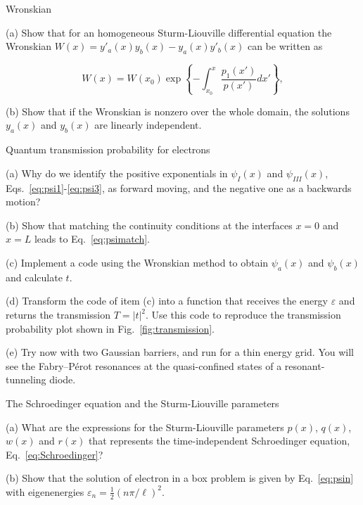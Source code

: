 \begin{problem}{Wronskian}
 \label{prob:Wronskian}

 (a) Show that for an homogeneous Sturm-Liouville differential equation the Wronskian $W(x) = y'_a(x)y_b(x)-y_a(x)y'_b(x)$ can be written as
 
\begin{equation}
 W(x) = W(x_0) \exp\left\{-\int_{x_0}^x \dfrac{p_1(x')}{p(x')}dx'\right\},
\end{equation}

 (b) Show that if the Wronskian is nonzero over the whole domain, the solutions $y_a(x)$ and $y_b(x)$ are linearly independent. 
 
\end{problem}


\begin{problem}{Quantum transmission probability for electrons}
 
 (a) Why do we identify the positive exponentials in $\psi_I(x)$ and $\psi_{III}(x)$, Eqs.~\eqref{eq:psi1}-\eqref{eq:psi3}, as forward moving, and the negative one as a backwards motion?
 
 (b) Show that matching the continuity conditions at the interfaces $x=0$ and $x=L$ leads to Eq.~\eqref{eq:psimatch}.
 
 (c) Implement a code using the Wronskian method to obtain $\psi_a(x)$ and $\psi_b(x)$ and calculate $t$.
 
 (d) Transform the code of item (c) into a function that receives the energy $\varepsilon$ and returns the transmission $T = |t|^2$. Use this code to reproduce the transmission probability plot shown in Fig.~\ref{fig:transmission}.
 
 (e) Try now with two Gaussian barriers, and run for a thin energy grid. You will see the Fabry–Pérot resonances at the quasi-confined states of a resonant-tunneling diode.
 
\end{problem}


\begin{problem}{The Schroedinger equation and the Sturm-Liouville parameters}
 
 (a) What are the expressions for the Sturm-Liouville parameters $p(x)$, $q(x)$, $w(x)$ and $r(x)$ that represents the time-independent Schroedinger equation, Eq.~\eqref{eq:Schroedinger}? 
 
 (b) Show that the solution of electron in a box problem is given by Eq.~\eqref{eq:psin} with eigenenergies $\varepsilon_n = \frac{1}{2}(n\pi/\ell)^2$.
 
\end{problem}


